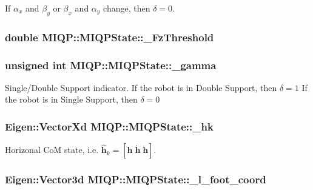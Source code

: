 \-If $\alpha_x$ and $\beta_y$ or $\beta_x$ and $\alpha_y$ change, then $\delta = 0$. \hypertarget{classMIQP_1_1MIQPState_a9eb5039dd699292c419f39514965e359}{
\subsubsection[{\-\_\-\-Fz\-Threshold}]{\setlength{\rightskip}{0pt plus 5cm}double {\bf \-M\-I\-Q\-P\-::\-M\-I\-Q\-P\-State\-::\-\_\-\-Fz\-Threshold}}}\label{classMIQP_1_1MIQPState_a9eb5039dd699292c419f39514965e359}
\hypertarget{classMIQP_1_1MIQPState_ab82daf9a470a885186cb733c4d4a72f8}{
\subsubsection[{\-\_\-gamma}]{\setlength{\rightskip}{0pt plus 5cm}unsigned int {\bf \-M\-I\-Q\-P\-::\-M\-I\-Q\-P\-State\-::\-\_\-gamma}}}\label{classMIQP_1_1MIQPState_ab82daf9a470a885186cb733c4d4a72f8}
\-Single/\-Double \-Support indicator. \-If the robot is in \-Double \-Support, then $\delta = 1$ \-If the robot is in \-Single \-Support, then $\delta = 0$ \hypertarget{classMIQP_1_1MIQPState_a1fa7e57c280b3cf451275fb9c617182b}{
\subsubsection[{\-\_\-hk}]{\setlength{\rightskip}{0pt plus 5cm}\-Eigen\-::\-Vector\-Xd {\bf \-M\-I\-Q\-P\-::\-M\-I\-Q\-P\-State\-::\-\_\-hk}}}\label{classMIQP_1_1MIQPState_a1fa7e57c280b3cf451275fb9c617182b}
\-Horizonal \-Co\-M state, i.\-e. $\hat{\mathbf{h}}_k = [\mathbf{h}\;\dot{\mathbf{h}}\;\ddot{\mathbf{h}}]$. \hypertarget{classMIQP_1_1MIQPState_a3027b3e93ce4c18f184c52438bed6e6a}{
\subsubsection[{\-\_\-l\-\_\-foot\-\_\-coord}]{\setlength{\rightskip}{0pt plus 5cm}\-Eigen\-::\-Vector3d {\bf \-M\-I\-Q\-P\-::\-M\-I\-Q\-P\-State\-::\-\_\-l\-\_\-foot\-\_\-coord}}}\label{classMIQP_1_1MIQPState_a3027b3e93ce4c18f184c52438bed6e6a}
